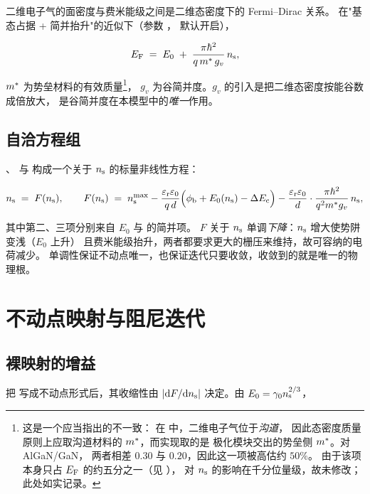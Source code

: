 二维电子气的面密度与费米能级之间是二维态密度下的 Fermi--Dirac 关系。
在"基态占据 + 简并抬升"的近似下（参数 ，
默认开启），

\begin{equation}
E_{\mathrm{F}} \;=\; E_0 \;+\; \frac{\pi\hbar^{2}}{q\,m^{*}\,g_v}\,n_{\mathrm{s}} ,
\label{eq:tw-ef}
\end{equation}

$m^{*}$ 为势垒材料的有效质量\footnote{这是一个应当指出的不一致：
      在  中，二维电子气位于\emph{沟道}，
      因此态密度质量原则上应取沟道材料的 $m^{*}$，而实现取的是
      极化模块交出的势垒侧 $m^{*}$。对 AlGaN/GaN，
      两者相差 $0.30$ 与 $0.20$，因此这一项被高估约 $50\%$。
      由于该项本身只占 $E_{\mathrm{F}}$ 的约五分之一（见 ），
      对 $n_{\mathrm{s}}$ 的影响在千分位量级，故未修改；此处如实记录。}，
$g_v$ 为谷简并度。$g_v$ 的引入是把二维态密度按能谷数成倍放大，
是谷简并度在本模型中的\emph{唯一}作用。

\subsection{自洽方程组}

、 与  构成一个关于
$n_{\mathrm{s}}$ 的标量非线性方程：

\begin{equation}
n_{\mathrm{s}} \;=\; F(n_{\mathrm{s}}),
\qquad
F(n_{\mathrm{s}}) \;=\; n_{\mathrm{s}}^{\max} - \frac{\varepsilon_{\mathrm{r}}\varepsilon_{0}}{q\,d}
\Bigl(\phi_{\mathrm{b}} + E_0(n_{\mathrm{s}}) - \Delta E_{\mathrm{c}}\Bigr)
- \frac{\varepsilon_{\mathrm{r}}\varepsilon_{0}}{d}\cdot\frac{\pi\hbar^{2}}{q^{2}m^{*} g_v}\,n_{\mathrm{s}} ,
\label{eq:tw-fixedpoint}
\end{equation}

其中第二、三项分别来自 $E_0$ 与  的简并项。
$F$ 关于 $n_{\mathrm{s}}$ 单调\emph{下降}：$n_{\mathrm{s}}$ 增大使势阱变浅（$E_0$ 上升）
且费米能级抬升，两者都要求更大的栅压来维持，故可容纳的电荷减少。
单调性保证不动点唯一，也保证迭代只要收敛，收敛到的就是唯一的物理根。

\section{不动点映射与阻尼迭代}
\label{sec:tw-formulation}

\subsection{裸映射的增益}

把  写成不动点形式后，其收缩性由
$\left\lvert \mathrm{d}F/\mathrm{d}n_{\mathrm{s}} \right\rvert$ 决定。由 $E_0=\gamma_0n_{\mathrm{s}}^{2/3}$，

